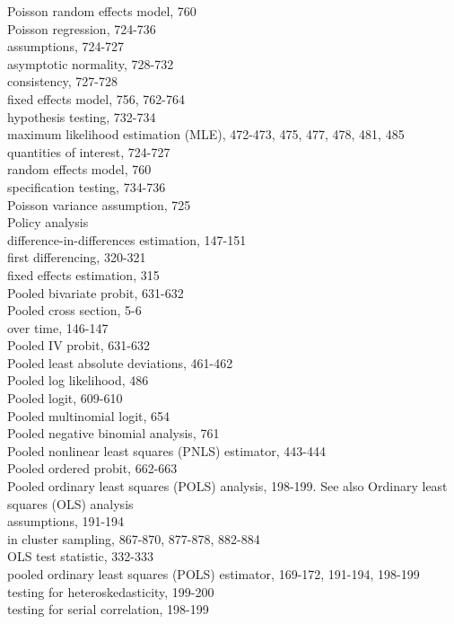 \documentclass[10pt]{article}
\begin{document}
Poisson random effects model, 760\\
Poisson regression, 724-736\\
assumptions, 724-727\\
asymptotic normality, 728-732\\
consistency, 727-728\\
fixed effects model, 756, 762-764\\
hypothesis testing, 732-734\\
maximum likelihood estimation (MLE), 472-473, 475, 477, 478, 481, 485\\
quantities of interest, 724-727\\
random effects model, 760\\
specification testing, 734-736\\
Poisson variance assumption, 725\\
Policy analysis\\
difference-in-differences estimation, 147-151\\
first differencing, 320-321\\
fixed effects estimation, 315\\
Pooled bivariate probit, 631-632\\
Pooled cross section, 5-6\\
over time, 146-147\\
Pooled IV probit, 631-632\\
Pooled least absolute deviations, 461-462\\
Pooled log likelihood, 486\\
Pooled logit, 609-610\\
Pooled multinomial logit, 654\\
Pooled negative binomial analysis, 761\\
Pooled nonlinear least squares (PNLS) estimator, 443-444\\
Pooled ordered probit, 662-663\\
Pooled ordinary least squares (POLS) analysis, 198-199. See also Ordinary least squares (OLS) analysis\\
assumptions, 191-194\\
in cluster sampling, 867-870, 877-878, 882-884\\
OLS test statistic, 332-333\\
pooled ordinary least squares (POLS) estimator, 169-172, 191-194, 198-199\\
testing for heteroskedasticity, 199-200\\
testing for serial correlation, 198-199\\
\end{document}
